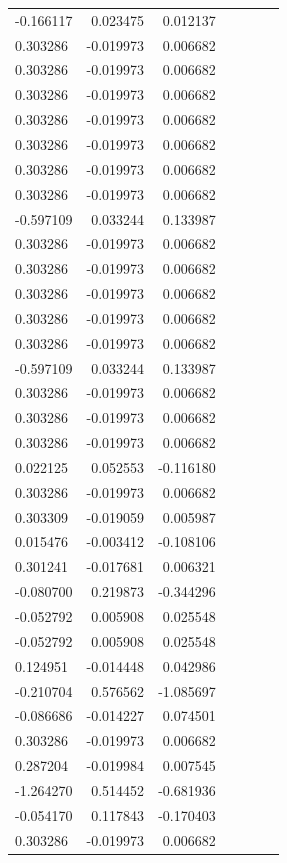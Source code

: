 \documentclass[a4paper,twoside,12pt]{book}
\begin{document}
\begin{appendices}
\begin{table}
\begin{tabular}{lrrrrrr}
	-0.166117 &  0.023475 &  0.012137 \\
	 0.303286 & -0.019973 &  0.006682 \\
	 0.303286 & -0.019973 &  0.006682 \\
	 0.303286 & -0.019973 &  0.006682 \\
	 0.303286 & -0.019973 &  0.006682 \\
	 0.303286 & -0.019973 &  0.006682 \\
	 0.303286 & -0.019973 &  0.006682 \\
	 0.303286 & -0.019973 &  0.006682 \\
	-0.597109 &  0.033244 &  0.133987 \\
	 0.303286 & -0.019973 &  0.006682 \\
	 0.303286 & -0.019973 &  0.006682 \\
	 0.303286 & -0.019973 &  0.006682 \\
	 0.303286 & -0.019973 &  0.006682 \\
	 0.303286 & -0.019973 &  0.006682 \\
	-0.597109 &  0.033244 &  0.133987 \\
	 0.303286 & -0.019973 &  0.006682 \\
	 0.303286 & -0.019973 &  0.006682 \\
	 0.303286 & -0.019973 &  0.006682 \\
	 0.022125 &  0.052553 & -0.116180 \\
	 0.303286 & -0.019973 &  0.006682 \\
	 0.303309 & -0.019059 &  0.005987 \\
	 0.015476 & -0.003412 & -0.108106 \\
	 0.301241 & -0.017681 &  0.006321 \\
	-0.080700 &  0.219873 & -0.344296 \\
	-0.052792 &  0.005908 &  0.025548 \\
	-0.052792 &  0.005908 &  0.025548 \\
	 0.124951 & -0.014448 &  0.042986 \\
	-0.210704 &  0.576562 & -1.085697 \\
	-0.086686 & -0.014227 &  0.074501 \\
	 0.303286 & -0.019973 &  0.006682 \\
	 0.287204 & -0.019984 &  0.007545 \\
	-1.264270 &  0.514452 & -0.681936 \\
	-0.054170 &  0.117843 & -0.170403 \\
	 0.303286 & -0.019973 &  0.006682 \\

\end{tabular}
\end{table}
\end{appendices}
\end{document}
